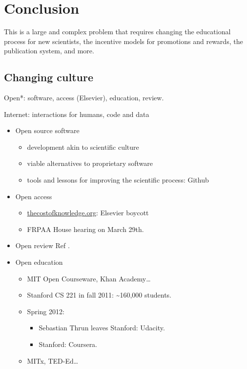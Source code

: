 \documentclass[ChapterTOCs,krantz2]{krantz} %
\begin{document}
\section{Conclusion}\label{conclusion}

This is a large and complex problem that requires changing the educational
process for new scientists, the incentive models for promotions and
rewards, the publication system, and more.


\subsection{Changing culture}

Open{*}: software, access (Elsevier), education, review.

Internet: interactions for humans, code and data

\begin{itemize}
\item Open source software

\begin{itemize}
\item development akin to scientific culture
\item viable alternatives to proprietary software
\item tools and lessons for improving the scientific process: Github
\end{itemize}

\item Open access

\begin{itemize}
\item \url{thecostofknowledge.org}: Elsevier boycott
\item FRPAA House hearing on March 29th.
\end{itemize}

\item Open review
Ref \cite{10.3389/fncom.2012.00018}.

\item Open education

\begin{itemize}
\item MIT Open Courseware, Khan Academy\ldots
\item Stanford CS 221 in fall 2011: \textasciitilde{}160,000 students.
\item Spring 2012:

\begin{itemize}
\item Sebastian Thrun leaves Stanford: Udacity.
\item Stanford: Coursera.
\end{itemize}
\item MITx, TED-Ed\ldots
\end{itemize}
\end{itemize}
\end{document}
